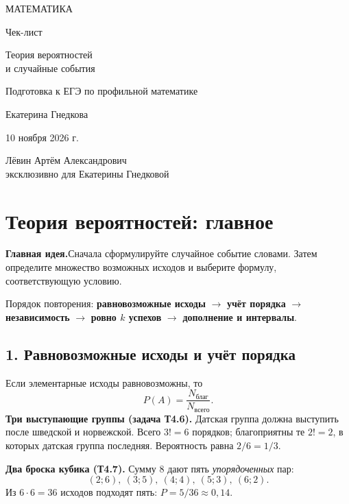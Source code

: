 \documentclass[a4paper,12pt]{article}
\newcommand{\topic}[1]{\section{#1}\vspace{-2mm}}
\newcommand{\subtopic}[1]{\subsection*{\textcolor{darkaccent}{#1}}\vspace{-1mm}}
\newcommand{\idea}[1]{\textcolor{darkaccent}{\textbf{Главная идея.}}\enspace #1}
\begin{document}
\thispagestyle{empty}
\begin{center}
\vspace*{28mm}
{\large\color{darkaccent} МАТЕМАТИКА}\par
\vspace{21mm}
{\LARGE\color{textgray}Чек-лист}\par
\vspace{12mm}
{\LARGE\color{accent}Теория вероятностей\\[3mm] и случайные события}\par
\vspace{16mm}
{\normalsize Подготовка к ЕГЭ по профильной математике}\par
\vspace{35mm}
{\large Екатерина Гнедкова}\par
\vspace{11mm}
{\normalsize 10 ноября 2026 г.}\par
\vfill
{\small Лёвин Артём Александрович\\[2mm]
эксклюзивно для Екатерины Гнедковой}\par
\vspace{11mm}
\end{center}
\clearpage

\topic{Теория вероятностей: главное}
\idea{Сначала сформулируйте случайное событие словами. Затем определите множество возможных исходов и выберите формулу, соответствующую условию.}

Порядок повторения: \textbf{равновозможные исходы} $\rightarrow$ \textbf{учёт порядка} $\rightarrow$ \textbf{независимость} $\rightarrow$ \textbf{ровно $k$ успехов} $\rightarrow$ \textbf{дополнение и интервалы}.

\subtopic{1. Равновозможные исходы и учёт порядка}
Если элементарные исходы равновозможны, то
\[
\boxed{P(A)=\frac{N_{\text{благ}}}{N_{\text{всего}}}}.
\]
\textbf{Три выступающие группы (задача Т4.6).} Датская группа должна выступить после шведской и норвежской. Всего $3!=6$ порядков; благоприятны те $2!=2$, в которых датская группа последняя. Вероятность равна $2/6=1/3$.

\textbf{Два броска кубика (Т4.7).} Сумму $8$ дают пять \emph{упорядоченных} пар:
\[
(2;6),\ (3;5),\ (4;4),\ (5;3),\ (6;2).
\]
Из $6\cdot6=36$ исходов подходят пять: $P=5/36\approx0{,}14$.
\end{document}
